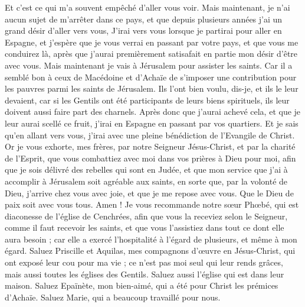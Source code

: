 \begin{multicols}{2}
Et c’est ce qui m'a souvent empêché d’aller vous voir.
Mais maintenant, je n’ai aucun sujet de m’arrêter dans ce pays, et que depuis plusieurs années j'ai un grand désir d’aller vers vous,
J’irai vers vous lorsque je partirai pour aller en Espagne, et j’espère que je vous verrai en passant par votre pays, et que vous me conduirez là, après que j’aurai premièrement satisafait en partie mon désir d’être avec vous.
Mais maintenant je vais à Jérusalem pour assister les saints.
Car il a semblé bon à ceux de Macédoine et d’Achaïe de s’imposer une contribution pour les pauvres parmi les saints de Jérusalem.
Ils l’ont bien voulu, dis-je, et ils le leur devaient, car si les Gentils ont été participants de leurs biens spirituels, ils leur doivent aussi faire part des charnels.
Après donc que j’aurai achevé cela, et que je leur aurai scellé ce fruit, j’irai en Espagne en passant par vos quartiers.
Et je sais qu’en allant vers vous, j’irai avec une pleine bénédiction de l'Evangile de Christ.
Or je vous exhorte, mes frères, par notre Seigneur Jésus-Christ, et par la charité de l’Esprit, que vous combattiez avec moi dans vos prières à Dieu pour moi,
afin que je sois délivré des rebelles qui sont en Judée, et que mon service que j'ai à accomplir à Jérusalem soit agréable aux saints,
en sorte que, par la volonté de Dieu, j’arrive chez vous avec joie, et que je me repose avec vous.
Que le Dieu de paix soit avec vous tous. Amen !
\VerseOne{}Je vous recommande notre sœur Phœbé, qui est diaconesse de l'église de Cenchrées,
afin que vous la receviez selon le Seigneur, comme il faut recevoir les saints, et que vous l'assistiez dans tout ce dont elle aura besoin ; car elle a exercé l'hospitalité à l'égard de plusieurs, et même à mon égard.
Saluez Priscille et Aquilas, mes compagnons d’œuvre en Jésus-Christ,
qui ont exposé leur cou pour ma vie ; ce n’est pas moi seul qui leur rends grâces, mais aussi toutes les églises des Gentils.
Saluez aussi l'église qui est dans leur maison. Saluez Epaïnète, mon bien-aimé, qui a été pour Christ les prémices d'Achaïe.
Saluez Marie, qui a beaucoup travaillé pour nous.

\end{multicols}
